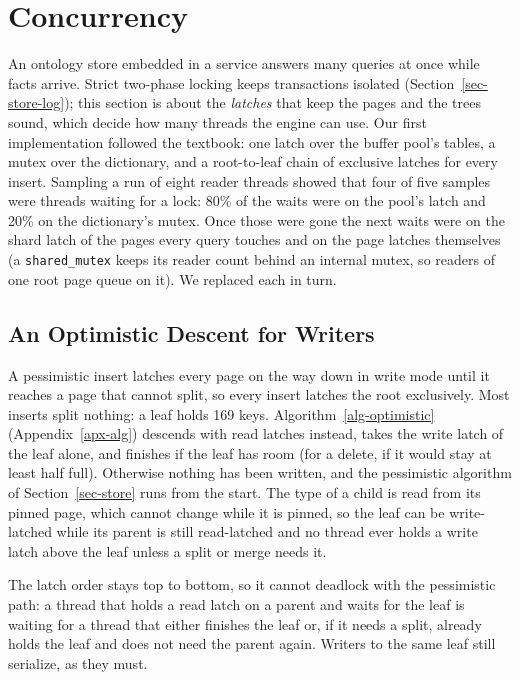 \section{Concurrency}
\label{sec-conc}

An ontology store embedded in a service answers many queries at once while
facts arrive.
Strict two-phase locking keeps transactions isolated (Section~\ref{sec-store-log});
this section is about the \emph{latches} that keep the pages and the trees
sound, which decide how many threads the engine can use.
Our first implementation followed the textbook: one latch over the buffer
pool's tables, a mutex over the dictionary, and a root-to-leaf chain of
exclusive latches for every insert.
Sampling a run of eight reader threads showed that four of five samples were
threads waiting for a lock: 80\% of the waits were on the pool's latch and
20\% on the dictionary's mutex.
Once those were gone the next waits were on the shard latch of the pages every
query touches and on the page latches themselves (a \texttt{shared\_mutex} keeps
its reader count behind an internal mutex, so readers of one root page queue
on it).
We replaced each in turn.

\subsection{An Optimistic Descent for Writers}

A pessimistic insert latches every page on the way down in write mode until
it reaches a page that cannot split, so every insert latches the root
exclusively.
Most inserts split nothing: a leaf holds 169 keys.
Algorithm~\ref{alg-optimistic} (Appendix~\ref{apx-alg}) descends with read latches instead, takes the
write latch of the leaf alone, and finishes if the leaf has room (for a
delete, if it would stay at least half full).
Otherwise nothing has been written, and the pessimistic algorithm of
Section~\ref{sec-store} runs from the start.
The type of a child is read from its pinned page, which cannot change while it
is pinned, so the leaf can be write-latched while its parent is still
read-latched and no thread ever holds a write latch above the leaf unless a
split or merge needs it.


The latch order stays top to bottom, so it cannot deadlock with the
pessimistic path: a thread that holds a read latch on a parent and waits for
the leaf is waiting for a thread that either finishes the leaf or, if it
needs a split, already holds the leaf and does not need the parent again.
Writers to the same leaf still serialize, as they must.

